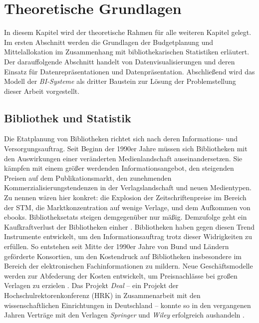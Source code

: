 \chapter{Theoretische Grundlagen}
\label{chap:two}
In diesem Kapitel wird der theoretische Rahmen für alle weiteren Kapitel gelegt. Im
ersten Abschnitt werden die Grundlagen der Budgetplanung und Mittelallokation im Zusammenhang mit bibliothekarischen Statistiken erläutert. 
Der darauffolgende Abschnitt handelt von Datenvisualisierungen und deren Einsatz
für Datenrepräsentationen und Datenpräsentation. Abschließend wird das Modell der \textit{\acrlong{BI}-Systeme} als dritter Baustein zur Lösung der 
Problemstellung dieser Arbeit vorgestellt.

\section{Bibliothek und Statistik}
\label{chap:two_one}
Die Etatplanung von Bibliotheken richtet sich nach deren Informations- und Versorgungsauftrag. 
Seit Beginn der 1990er Jahre müssen sich Bibliotheken mit den Auswirkungen einer veränderten Medienlandschaft auseinandersetzen.
Sie kämpfen mit einem größer werdenden Informationsangebot, den steigenden Preisen auf dem Publikationsmarkt, 
den zunehmenden Kommerzialisierungstendenzen in der Verlagslandschaft und neuen Medientypen. 
Zu nennen wären hier konkret: die Explosion der Zeitschriftenpreise im Bereich der \acrfull{STM}, die Marktkonzentration auf wenige Verlage, 
und dem Aufkommen von ebooks. Bibliotheksetats steigen demgegenüber nur mäßig. 
Demzufolge geht ein Kaufkraftverlust der Bibliotheken einher \cite[vgl.][164 ff.]{moravetz-kuhlmann_monika_erwerbungspolitik_2015}.
Bibliotheken haben gegen diesen Trend Instrumente entwickelt, um den Informationsauftrag trotz dieser Widrigkeiten zu erfüllen.
So entstehen seit Mitte der 1990er Jahre von Bund und Ländern geförderte Konsortien, um den Kostendruck auf Bibliotheken insbesondere im Bereich der elektronischen
Fachinformationen zu mildern. Neue Geschäftsmodelle werden zur Abfederung der Kosten entwickelt, um Preisnachlässe bei großen Verlagen zu erzielen
\cite[vgl.][169 ff.]{moravetz-kuhlmann_monika_erwerbungspolitik_2015}. Das Projekt \textit{Deal} -- ein Projekt der Hochschulrektorenkonferenz (HRK) in Zusammenarbeit mit den
wissenschaftlichen Einrichtungen in Deutschland -- konnte so in den vergangenen Jahren Verträge mit den Verlagen \textit{Springer} und \textit{Wiley} erfolgreich aushandeln \cite[vgl.][]{projekt_deal_projekt_2020}.

